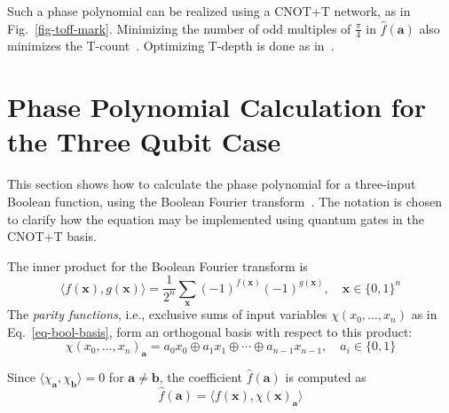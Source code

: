 \documentclass[a4paper]{article}
\begin{document}
Such a phase polynomial can be realized using a CNOT+T network, as in Fig.~\ref{fig-toff-mark}. Minimizing the number of odd multiples of $\frac{\pi}{4}$ in $\hat{f}(\mathbf{a})$ also minimizes the T-count~\cite{bib-amy-rm}. Optimizing T-depth is done as in~\cite{bib-amy-matroid}.

\section{Phase Polynomial Calculation for the Three Qubit Case}
\label{Chap:Bool-pbool3q}

This section shows how to calculate the phase polynomial for a three-input Boolean function, using the Boolean Fourier transform~\cite{bib-odonnell}. The notation is chosen to clarify how the equation may be implemented using quantum gates in the CNOT+T basis. 

The inner product for the Boolean Fourier transform is
\begin{equation}
  \label{eq-inner-prod}
  \langle f(\mathbf{x}) , g(\mathbf{x}) \rangle = \frac{1}{2^n} \sum_{\mathbf{x}} (-1)^{f(\mathbf{x})} (-1)^{g(\mathbf{x})}, \quad \mathbf{x} \in \{0,1\}^n
\end{equation}
The {\it parity functions}, i.e., exclusive sums of input variables $\chi(x_0,\ldots,x_n)$ as in Eq.~\ref{eq-bool-basis}, form an orthogonal basis with respect to this product:
\begin{equation}
  \label{eq-bool-basis}
  \chi(x_0,\ldots,x_n)_{\mathbf{a}} = a_0 x_0 \oplus a_1 x_1 \oplus \cdots \oplus a_{n-1} x_{n-1},\quad a_i \in \{0,1\}
\end{equation}

Since $\langle \chi_{\mathbf{a}}, \chi_{\mathbf{b}} \rangle = 0$ for $\mathbf{a} \neq \mathbf{b}$, the coefficient $\hat{f}(\mathbf{a})$ is computed as
\begin{equation}
  \label{eq-fhat-prod}
  \hat{f}(\mathbf{a}) = \langle f(\mathbf{x}), \chi(\mathbf{x})_{\mathbf{a}} \rangle
\end{equation}
\end{document}
